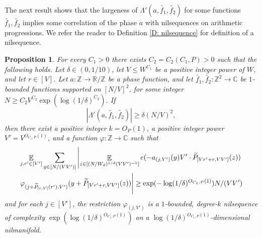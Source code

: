 \documentclass[11pt]{amsart}
\newtheorem{proposition}[lemma]{Proposition}
\theoremstyle{definition}
\DeclareMathOperator*{\E}{\mathbb{E}}
\newcommand{\C}{{\mathbb C}}
\newcommand{\R}{{\mathbb R}}
\newcommand{\Z}{{\mathbb Z}}
\begin{document}
The next result shows that the largeness of $\Lambda'(a,\widetilde{f_1}, \widetilde{f_2})$ for some functions $\widetilde{f_1}, \widetilde{f_2}$ implies some correlation of the phase $a$ with nilsequences on arithmetic progressions. We refer the reader to Definition \ref{D: nilsequence} for definition of a nilsequence.
\begin{proposition}\label{P: local correlation with nilsequences}
For every $C_1>0$ there exists $C_2=C_2(C_1,P)>0$ such that the following holds. Let $\delta\in(0,1/10)$, let $V \le W^{C_1}$ be a positive integer power of $W$, and let $r\in[V]$.
Let $a:\Z\to\R/\Z$ be a phase function, and let $\widetilde{f_1},\widetilde{f_2}: \Z^2 \to \mathbb{C}$ be $1$-bounded functions supported on $[N/V]^2$, for some integer $N\ge C_2V^{C_2}\exp(\log(1/\delta)^{C_2})$.  If
    $$|\Lambda'(a,\widetilde{f_1}, \widetilde{f_2})| \geq \delta (N/V)^{2},$$
    then there exist a positive integer $k=O_P(1)$,
    a positive integer power $V' = V^{O_{C_1, P}(1)}$, and a function $\varphi:\Z\to\C$ such that
\begin{multline*}
    \E_{j, r'\in[V']}\sum_{y\in[N/(VV')]}\left|\E_{z \in [(N/W_d)^{1/d}(VV')^{-1}]} e(-a_{(j, V')}(y)V'\cdot\widetilde{P}_{[Vr'+r,VV']}(z))\right.\\
    \left.\varphi_{({j} + \widetilde{P}_{[r,V]}(r'), V')}(y + \widetilde{P}_{[Vr'+r,VV']}(z)) \vphantom{\E_{z \in [(N/W_d)^{1/d}(VV')^{-1}]}} \right| \geq \exp(-\log(1/\delta)^{O_{C_1, P}(1)}) N/(VV')
\end{multline*}
and for each $j\in[V']$, the restriction $\varphi_{(j,V')}$ is a $1$-bounded, degree-$k$ nilsequence of complexity $\exp(\log(1/\delta)^{O_{C_1, P}(1)})$ on a $\log(1/\delta)^{O_{C_1, P}(1)}$-dimensional nilmanifold. 

\end{proposition}
\end{document}
